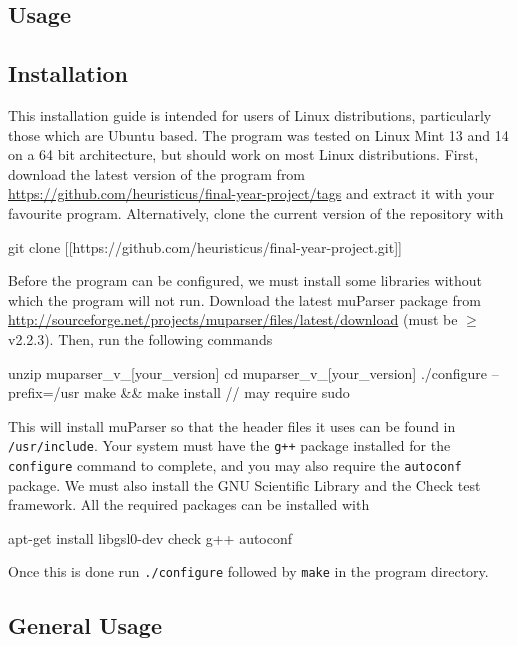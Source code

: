 \documentclass[a4paper,11pt]{article}
\begin{document}
\begin{appendices}
\section{Usage}
\label{sec-10}
\subsection{Installation}
\label{sec-10-1}

   This installation guide is intended for users of Linux distributions,
   particularly those which are Ubuntu based. The program was tested on Linux
   Mint 13 and 14 on a 64 bit architecture, but should work on most Linux
   distributions. First, download the latest version of the program from
   \href{https://github.com/heuristicus/final-year-project/tags}{https://github.com/heuristicus/final-year-project/tags} and extract it with
   your favourite program. Alternatively, clone the current version of the
   repository with
   \begin{verbatimtab} 
   git clone [[https://github.com/heuristicus/final-year-project.git]]
   \end{verbatimtab}
   Before the program can be configured, we must install some libraries without
   which the program will not run. Download the latest muParser package from
   \href{http://sourceforge.net/projects/muparser/files/latest/download}{http://sourceforge.net/projects/muparser/files/latest/download} (must be
   $\geq$ v2.2.3). Then, run the following commands
   \begin{verbatimtab}
   unzip muparser_v_[your_version]
   cd muparser_v_[your_version]
   ./configure --prefix=/usr
   make && make install // may require sudo
   \end{verbatimtab}
   This will install muParser so that the header files it uses can be found in
   \texttt{/usr/include}. Your system must have the \texttt{g++} package
   installed for the \texttt{configure} command to complete, and you may also
   require the \texttt{autoconf} package. We must also install the GNU
   Scientific Library and the Check test framework. All the required packages
   can be installed with
   \begin{verbatimtab}
   apt-get install libgsl0-dev check g++ autoconf
   \end{verbatimtab}
   Once this is done run \texttt{./configure} followed by \texttt{make} in the
   program directory.
\subsection{General Usage}
\label{sec-10-2}


\end{appendices}
\end{document}
